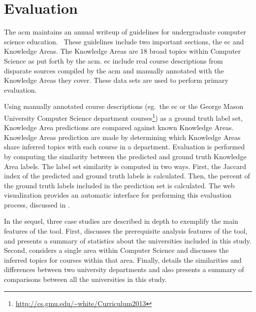 \section{Evaluation}
\label{sec:evaluation}


The \ac{acm} maintains an annual writeup of guidelines for undergraduate computer science education.~\cite{CS2013}
These guidelines include two important sections, the \acf{ec} and Knowledge Areas.
The Knowledge Areas are 18 broad topics within Computer Science as put forth by the \ac{acm}.
\ac{ec} include real course descriptions from disparate sources compiled by the \ac{acm} and manually annotated with the Knowledge Areas they cover.
These data sets are used to perform primary evaluation.


Using manually annotated course descriptions (eg.\ the \ac{ec} or the George Mason University Computer Science department courses\footnote{\url{http://cs.gmu.edu/~white/Curriculum2013}}) as a ground truth label set, Knowledge Area predictions are compared against known Knowledge Areas.
Knowledge Areas prediction are made by determining which Knowledge Areas share inferred topics with each course in a department.
Evaluation is performed by computing the similarity between the predicted and ground truth Knowledge Area labels.
The label set similarity is computed in two ways.
First, the Jaccard index of the predicted and ground truth labels is calculated.
Then, the percent of the ground truth labels included in the prediction set is calculated.
The web visualization provides an automatic interface for performing this evaluation process, discussed in .


In the sequel, three case studies are described in depth to exemplify the main features of the tool.
First,  discusses the prerequisite analysis features of the tool, and presents a summary of statistics about the universities included in this study.
Second,  considers a single area within Computer Science and discusses the inferred topics for courses within that area.
Finally,  details the similarities and differences between two university departments and also presents a summary of comparisons between all the universities in this study.

